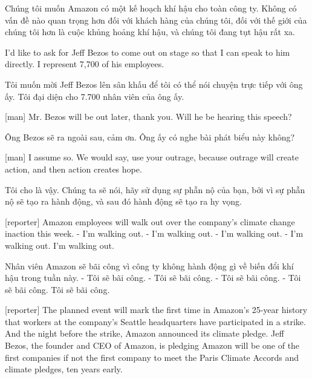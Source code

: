 \documentclass[a4paper]{article}
\begin{document}
	\begin{vietnamese-v2}
		Chúng tôi muốn Amazon có một kế hoạch khí hậu cho toàn công ty.
		Không có vấn đề nào quan trọng hơn đối với khách hàng của chúng tôi, đối với thế giới của chúng tôi hơn là cuộc khủng hoảng khí hậu, và chúng tôi đang tụt hậu rất xa.	
	\end{vietnamese-v2}
	
	I'd like to ask for Jeff Bezos to come out on stage so that I can speak to him directly.
	I represent 7,700 of his employees.
	
	\begin{vietnamese-v2}
		Tôi muốn mời Jeff Bezos lên sân khấu để tôi có thể nói chuyện trực tiếp với ông ấy.
		Tôi đại diện cho 7.700 nhân viên của ông ấy.
	\end{vietnamese-v2}
	
	[man] Mr. Bezos will be out later, thank you.
	Will he be hearing this speech?
	
	\begin{vietnamese-v2}
		[man] Ông Bezos sẽ ra ngoài sau, cảm ơn.
		Ông ấy có nghe bài phát biểu này không?
	\end{vietnamese-v2}
	
	[man] I assume so.
	We would say, use your outrage, because outrage will create action, and then action creates hope.
	
	\begin{vietnamese-v2}
		 Tôi cho là vậy.
		Chúng ta sẽ nói, hãy sử dụng sự phẫn nộ của bạn, bởi vì sự phẫn nộ sẽ tạo ra hành động, và sau đó hành động sẽ tạo ra hy vọng.
	\end{vietnamese-v2}
	
	[reporter] Amazon employees will walk out over the company's climate change inaction this week.
	- I'm walking out. - I'm walking out.
	- I'm walking out. - I'm walking out.
	I'm walking out.
	
	\begin{vietnamese-v2}
		 Nhân viên Amazon sẽ bãi công vì công ty không hành động gì về biến đổi khí hậu trong tuần này.
		- Tôi sẽ bãi công. - Tôi sẽ bãi công.
		- Tôi sẽ bãi công. - Tôi sẽ bãi công.
		Tôi sẽ bãi công.
	\end{vietnamese-v2}
	
	[reporter] The planned event will mark the first time in Amazon's 25-year history that workers at the company's Seattle headquarters have participated in a strike.
	And the night before the strike, Amazon announced its climate pledge.
	Jeff Bezos, the founder and CEO of Amazon, is pledging Amazon will be one of the first companies if not the first company to meet the Paris Climate Accords and climate pledges, ten years early.
	
\end{document}
